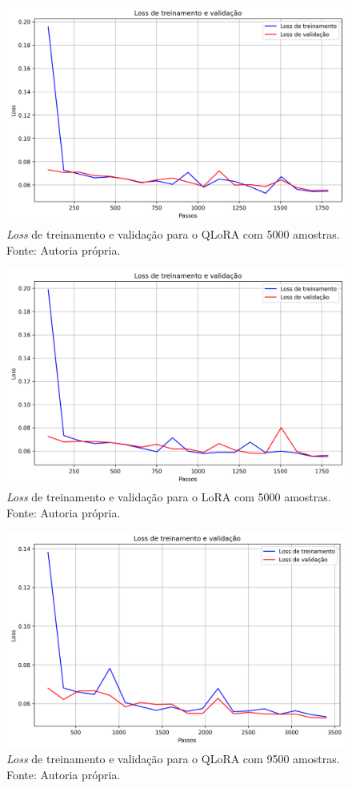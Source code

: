 \begin{figure}[ht]
    \centering
    \includegraphics[width=0.725\columnwidth,keepaspectratio]{images/loss_qlora_5000.png}
    \caption{\small \textit{Loss} de treinamento e validação para o \ac{QLoRA} com 5000 amostras. Fonte: Autoria própria.}
    \label{fig:loss_qlora_5000}
\end{figure}

\clearpage

\begin{figure}[ht]
    \centering
    \includegraphics[width=0.725\columnwidth,keepaspectratio]{images/loss_lora_5000.png}
    \caption{\small \textit{Loss} de treinamento e validação para o \ac{LoRA} com 5000 amostras. Fonte: Autoria própria.}
    \label{fig:loss_lora_5000}
\end{figure}

\begin{figure}[ht]
    \centering
    \includegraphics[width=0.725\columnwidth,keepaspectratio]{images/loss_qlora_9500.png}
    \caption{\small \textit{Loss} de treinamento e validação para o \ac{QLoRA} com 9500 amostras. Fonte: Autoria própria.}
    \label{fig:loss_qlora_9500}
\end{figure}

